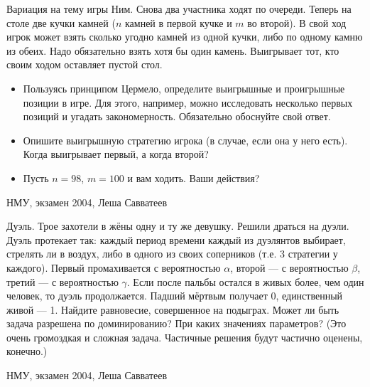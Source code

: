 \begin{problem}
Вариация на тему игры Ним. Снова два участника ходят по очереди. Теперь на столе две кучки камней ($n$ камней в первой кучке и $m$ во второй). В свой ход игрок может взять сколько угодно камней из одной кучки, либо по одному камню из обеих. Надо обязательно взять хотя бы один камень. Выигрывает тот, кто своим ходом оставляет пустой стол.
\begin{itemize}
\item Пользуясь принципом Цермело, определите выигрышные и проигрышные позиции в игре. Для этого, например, можно исследовать несколько первых позиций и угадать закономерность. Обязательно обоснуйте свой ответ.
\item Опишите выигрышную стратегию игрока (в случае, если она у него есть). Когда выигрывает первый, а когда второй?
\item Пусть $n = 98$, $m=100$ и вам ходить. Ваши действия?
\end{itemize}



\begin{source}
НМУ, экзамен 2004, Леша Савватеев
\end{source}


\begin{sol}

\end{sol}
\end{problem}




\begin{problem}
Дуэль. Трое захотели в жёны одну и ту же девушку. Решили драться на дуэли. Дуэль протекает так: каждый период времени каждый из дуэлянтов выбирает, стрелять ли в воздух, либо в одного из своих соперников (т.е. 3 стратегии у каждого). Первый промахивается с вероятностью $\alpha$, второй — с вероятностью $\beta$, третий — с вероятностью $\gamma$. Если после пальбы остался в живых более, чем один человек, то дуэль продолжается. Падший мёртвым получает 0, единственный живой — 1. Найдите равновесие, совершенное на подыграх. Может ли быть задача разрешена по доминированию? При каких значениях параметров? (Это очень громоздкая и сложная задача. Частичные решения будут частично оценены, конечно.)



\begin{source}
НМУ, экзамен 2004, Леша Савватеев
\end{source}


\begin{sol}

\end{sol}
\end{problem}




